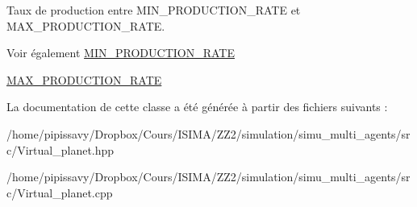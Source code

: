 Taux de production entre M\-I\-N\-\_\-\-P\-R\-O\-D\-U\-C\-T\-I\-O\-N\-\_\-\-R\-A\-T\-E et M\-A\-X\-\_\-\-P\-R\-O\-D\-U\-C\-T\-I\-O\-N\-\_\-\-R\-A\-T\-E. 

\begin{DoxySeeAlso}{Voir également}
\hyperlink{classVirtual__planet_a5c08ee009e9d9d0b284b133e18c2b7f9}{M\-I\-N\-\_\-\-P\-R\-O\-D\-U\-C\-T\-I\-O\-N\-\_\-\-R\-A\-T\-E} 

\hyperlink{classVirtual__planet_a0899115c7ae16c4e07e6319209b678cc}{M\-A\-X\-\_\-\-P\-R\-O\-D\-U\-C\-T\-I\-O\-N\-\_\-\-R\-A\-T\-E} 
\end{DoxySeeAlso}


La documentation de cette classe a été générée à partir des fichiers suivants \-:\begin{DoxyCompactItemize}
\item 
/home/pipissavy/\-Dropbox/\-Cours/\-I\-S\-I\-M\-A/\-Z\-Z2/simulation/simu\-\_\-multi\-\_\-agents/src/Virtual\-\_\-planet.\-hpp\item 
/home/pipissavy/\-Dropbox/\-Cours/\-I\-S\-I\-M\-A/\-Z\-Z2/simulation/simu\-\_\-multi\-\_\-agents/src/Virtual\-\_\-planet.\-cpp\end{DoxyCompactItemize}
